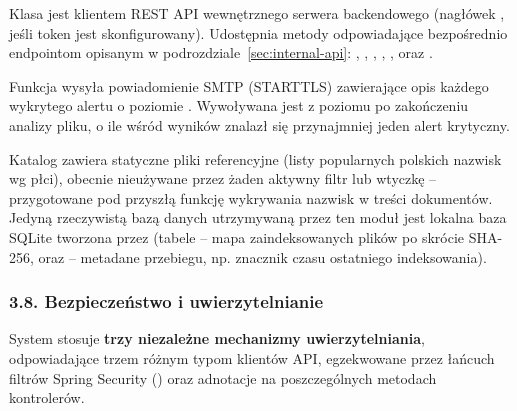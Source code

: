 
Klasa  jest klientem REST API wewnętrznego serwera backendowego (nagłówek
, jeśli token jest skonfigurowany). Udostępnia metody
odpowiadające bezpośrednio endpointom opisanym w podrozdziale~\ref{sec:internal-api}:
, ,
, ,
, 
oraz .


Funkcja  wysyła
powiadomienie SMTP (STARTTLS) zawierające opis każdego wykrytego alertu o poziomie .
Wywoływana jest z poziomu  po zakończeniu analizy pliku, o ile wśród
wyników znalazł się przynajmniej jeden alert krytyczny.


Katalog  zawiera statyczne pliki referencyjne (listy popularnych polskich nazwisk wg
płci), obecnie nieużywane przez żaden aktywny filtr lub wtyczkę -- przygotowane pod przyszłą
funkcję wykrywania nazwisk w treści dokumentów. Jedyną rzeczywistą bazą danych utrzymywaną przez
ten moduł jest lokalna baza SQLite tworzona przez  (tabele 
-- mapa zaindeksowanych plików po skrócie SHA-256, oraz  -- metadane przebiegu, np.
znacznik czasu ostatniego indeksowania).

\subsubsection*{3.8. Bezpieczeństwo i uwierzytelnianie}
\label{ch:bezpieczenstwo}

System stosuje \textbf{trzy niezależne mechanizmy uwierzytelniania}, odpowiadające trzem różnym
typom klientów API, egzekwowane przez łańcuch filtrów Spring Security ()
oraz adnotacje  na poszczególnych metodach kontrolerów.

